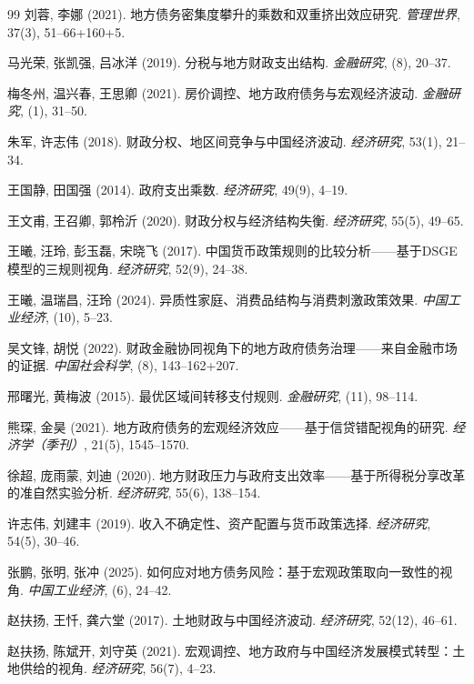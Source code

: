 \documentclass[12pt,UTF8]{ctexart}
\begin{document}
\begin{thebibliography}{99}
		刘蓉, 李娜 (2021). 地方债务密集度攀升的乘数和双重挤出效应研究. \textit{管理世界}, 37(3), 51--66+160+5.
		
		马光荣, 张凯强, 吕冰洋 (2019). 分税与地方财政支出结构. \textit{金融研究}, (8), 20--37.
		
		梅冬州, 温兴春, 王思卿 (2021). 房价调控、地方政府债务与宏观经济波动. \textit{金融研究}, (1), 31--50.
		
		朱军, 许志伟 (2018). 财政分权、地区间竞争与中国经济波动. \textit{经济研究}, 53(1), 21--34.
		
		王国静, 田国强 (2014). 政府支出乘数. \textit{经济研究}, 49(9), 4--19.
		
		王文甫, 王召卿, 郭柃沂 (2020). 财政分权与经济结构失衡. \textit{经济研究}, 55(5), 49--65.
		
		王曦, 汪玲, 彭玉磊, 宋晓飞 (2017). 中国货币政策规则的比较分析——基于DSGE模型的三规则视角. \textit{经济研究}, 52(9), 24--38.
		
		王曦, 温瑞昌, 汪玲 (2024). 异质性家庭、消费品结构与消费刺激政策效果. \textit{中国工业经济}, (10), 5--23.
		
		吴文锋, 胡悦 (2022). 财政金融协同视角下的地方政府债务治理——来自金融市场的证据. \textit{中国社会科学}, (8), 143--162+207.
		
		邢曙光, 黄梅波 (2015). 最优区域间转移支付规则. \textit{金融研究}, (11), 98--114.
		
		熊琛, 金昊 (2021). 地方政府债务的宏观经济效应——基于信贷错配视角的研究. \textit{经济学（季刊）}, 21(5), 1545--1570.
		
		徐超, 庞雨蒙, 刘迪 (2020). 地方财政压力与政府支出效率——基于所得税分享改革的准自然实验分析. \textit{经济研究}, 55(6), 138--154.
		
		许志伟, 刘建丰 (2019). 收入不确定性、资产配置与货币政策选择. \textit{经济研究}, 54(5), 30--46.
		
		张鹏, 张明, 张冲 (2025). 如何应对地方债务风险：基于宏观政策取向一致性的视角. \textit{中国工业经济}, (6), 24--42.
		
		赵扶扬, 王忏, 龚六堂 (2017). 土地财政与中国经济波动. \textit{经济研究}, 52(12), 46--61.
		
		赵扶扬, 陈斌开, 刘守英 (2021). 宏观调控、地方政府与中国经济发展模式转型：土地供给的视角. \textit{经济研究}, 56(7), 4--23.
		

\end{thebibliography}
\end{document}
